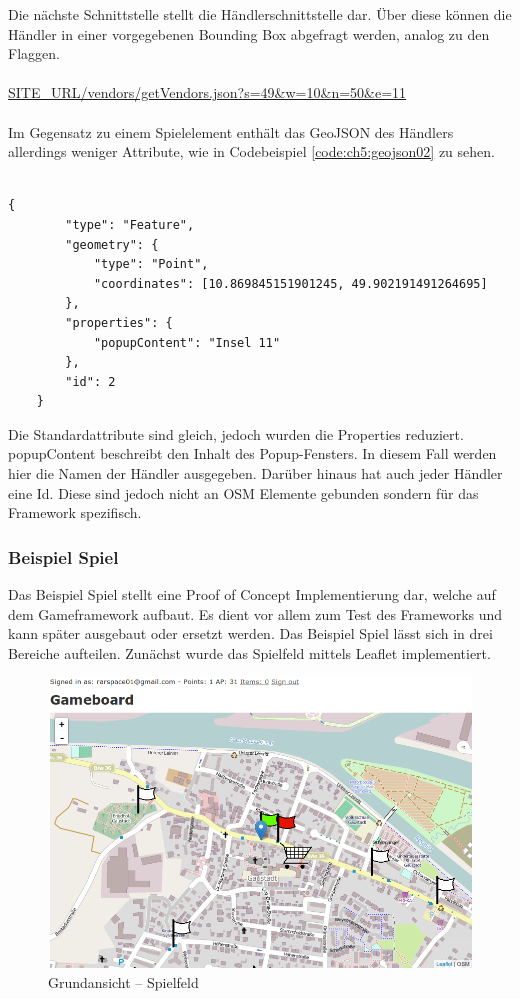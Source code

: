 Die nächste Schnittstelle stellt die Händlerschnittstelle dar. Über diese können die Händler in einer vorgegebenen Bounding Box abgefragt werden, analog zu den Flaggen.
\\\\
\url{SITE\_URL/vendors/getVendors.json?s=49&w=10&n=50&e=11}
\\\\
Im Gegensatz zu einem Spielelement enthält das GeoJSON des Händlers allerdings weniger Attribute, wie in Codebeispiel \ref{code:ch5:geojson02} zu sehen.
\\\\
\begin{lstlisting}[caption=GeoJSON Response Vendor (Reduziert), label=code:ch5:geojson02]
{
        "type": "Feature",
        "geometry": {
            "type": "Point",
            "coordinates": [10.869845151901245, 49.902191491264695]
        },
        "properties": {
            "popupContent": "Insel 11"
        },
        "id": 2
    }
\end{lstlisting}

Die Standardattribute sind gleich, jedoch wurden die Properties reduziert. \glqq popupContent\grqq{} beschreibt den Inhalt des Popup-Fensters. In diesem Fall werden hier die Namen der Händler ausgegeben. Darüber hinaus hat auch jeder Händler eine Id. Diese sind jedoch nicht an OSM Elemente gebunden sondern für das Framework spezifisch.

\subsubsection*{Beispiel Spiel}

Das Beispiel Spiel stellt eine Proof of Concept Implementierung dar, welche auf dem Gameframework aufbaut. Es dient vor allem zum Test des Frameworks und kann später ausgebaut oder ersetzt werden. Das Beispiel Spiel lässt sich in drei Bereiche aufteilen. Zunächst wurde das Spielfeld mittels Leaflet implementiert.

\begin{figure}[H]
\begin{center}
\includegraphics[width=150mm]{images/ch5_img09_gameboard.png}
\caption{Grundansicht -- Spielfeld}
\label{img:ch5_img09_gameboard}
\end{center}
\end{figure}


